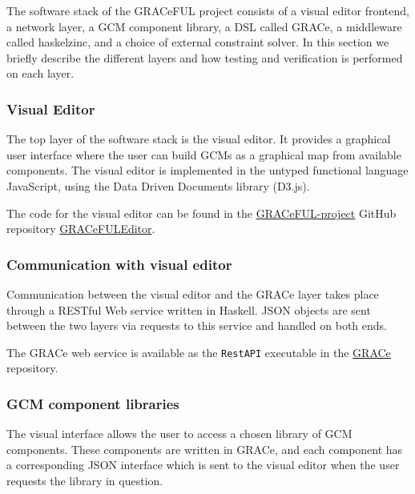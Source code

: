 The software stack of the GRACeFUL project consists of
%
a visual editor frontend,
%
a network layer,
%
a GCM component library,
%
a DSL called GRACe,
%
a middleware called haskelzinc, and
%
a choice of external constraint solver.
%
In this section we briefly describe the different layers and how testing and
verification is performed on each layer.

\subsubsection*{Visual Editor}

The top layer of the software stack is the visual editor.
%
It provides a graphical user interface where the user can build GCMs
as a graphical map from available components.
%
The visual editor is implemented in the untyped functional language
JavaScript, using the Data Driven Documents library (D3.js).
%

The code for the visual editor can be found in the 
\href{https://github.com/GRACeFUL-project}{GRACeFUL-project} GitHub
repository
\href{https://github.com/GRACeFUL-project/GRACeFULEditor}{GRACeFULEditor}.

\subsubsection*{Communication with visual editor}

Communication between the visual editor and the GRACe layer takes
place through a RESTful Web service written in Haskell.
%
JSON objects are sent between the two layers via requests to this
service and handled on both ends.

The GRACe web service is available as the \texttt{RestAPI} executable in the
\href{https://github.com/GRACeFUL-project/GRACe}{GRACe} repository.

\subsubsection*{GCM component libraries}

The visual interface allows the user to access a chosen library of GCM
components.
%
These components are written in GRACe, and each component has a
corresponding JSON interface which is sent to the visual editor when
the user requests the library in question.

